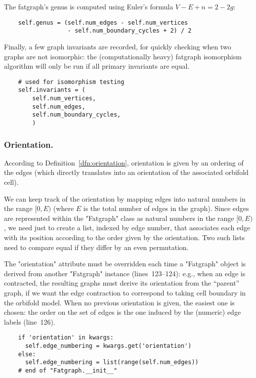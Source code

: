 The fatgraph's genus is computed using Euler's formula $V-E+n = 2-2g$:
\begin{lstlisting}
    self.genus = (self.num_edges - self.num_vertices
                  - self.num_boundary_cycles + 2) / 2

\end{lstlisting}
Finally, a few graph invariants are recorded, for quickly
checking when two graphs are not isomorphic: the (computationally
heavy) fatgraph isomorphism algorithm will only be run if all primary
invariants are equal.
\begin{lstlisting}
    # used for isomorphism testing
    self.invariants = (
        self.num_vertices,
        self.num_edges,
        self.num_boundary_cycles,
        )

\end{lstlisting}


\subsubsection{Orientation.}
According to Definition~\ref{dfn:orientation}, orientation is given by an
ordering of the edges (which directly translates into an orientation
of the associated orbifold cell).

We can keep track of the orientation by mapping edges into natural
numbers in the range $[0, E)$ (where $E$ is the total number of edges
in the graph).  Since edges are represented within the "Fatgraph"
class as natural numbers in the range $[0, E)$, we need just to create
a list, indexed by edge number, that associates each edge with its
position according to the order given by the orientation.  Two such
lists need to compare equal if they differ by an even permutation.

The "orientation" attribute must be overridden each time a "Fatgraph"
object is derived from another "Fatgraph" instance (lines~123--124): e.g., when an edge
is contracted, the resulting graphs must derive its orientation from
the ``parent'' graph, if we want the edge contraction to correspond to
taking cell boundary in the orbifold model.  When no previous
orientation is given, the easiest one is chosen: the order on the set
of edges is the one induced by the (numeric) edge labels (line~126).
\begin{lstlisting}
    if 'orientation' in kwargs:
      self.edge_numbering = kwargs.get('orientation')
    else:
      self.edge_numbering = list(range(self.num_edges))
    # end of "Fatgraph.__init__"

\end{lstlisting}


